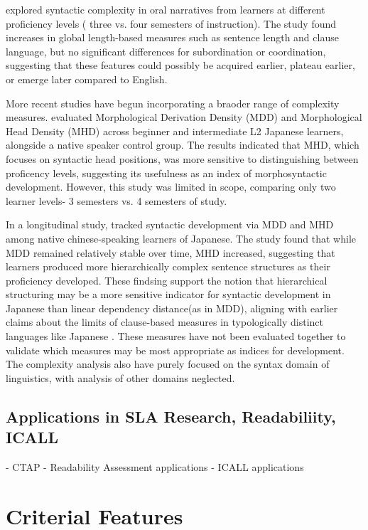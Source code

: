 \cite{Iwashita2006} explored syntactic complexity in oral narratives from learners at different proficiency levels (
three vs. four semesters of instruction). The study found increases in global length-based measures such as sentence
length and clause language, but no significant differences for subordination or coordination, suggesting that these
features could possibly be acquired earlier, plateau earlier, or emerge later compared to English.

More recent studies have begun incorporating a braoder range of complexity measures. \cite{komori2019} evaluated
Morphological Derivation Density (MDD) and Morphological Head Density (MHD) across beginner and intermediate L2
Japanese learners, alongside a native speaker control group. The results indicated that MHD, which focuses on
syntactic head positions, was more sensitive to distinguishing between proficency levels, suggesting its usefulness
as an index of morphosyntactic development. However, this study was limited in scope, comparing only two learner
levels- 3 semesters vs. 4 semesters of study.

In a longitudinal study, \cite{Yang2023} tracked syntactic development via MDD and MHD among native chinese-speaking
learners of Japanese. The study found that while MDD remained relatively stable over time, MHD increased, suggesting
that learners produced more hierarchically complex sentence structures as their proficiency developed. These
findsing support the notion that hierarchical structuring may be a more sensitive indicator for syntactic development
in Japanese than linear dependency distance(as in MDD), aligning with earlier claims about the limits of
clause-based measures in typologically distinct languages like Japanese \citep{Iwashita2006}. These measures have
not been evaluated together to validate which measures may be most appropriate as indices for development. The
complexity analysis also have purely focused on the syntax domain of linguistics, with
analysis of other domains neglected.

\subsection{Applications in SLA Research, Readabiliity, ICALL}
- CTAP
- Readability Assessment applications
- ICALL applications


\section{Criterial Features}

